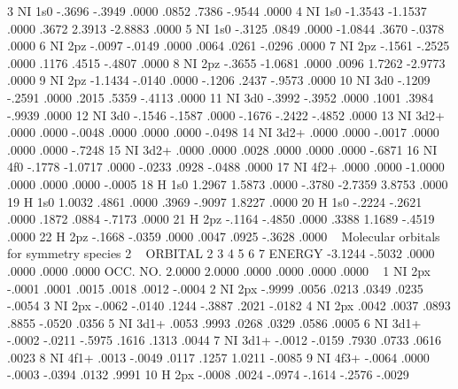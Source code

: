 \begin{sourcelisting}
 3 NI  1s0     -.3696    -.3949     .0000     .0852     .7386    -.9544     .0000 
 4 NI  1s0    -1.3543   -1.1537     .0000     .3672    2.3913   -2.8883     .0000 
 5 NI  1s0     -.3125     .0849     .0000   -1.0844     .3670    -.0378     .0000 
 6 NI  2pz     -.0097    -.0149     .0000     .0064     .0261    -.0296     .0000 
 7 NI  2pz     -.1561    -.2525     .0000     .1176     .4515    -.4807     .0000 
 8 NI  2pz     -.3655   -1.0681     .0000     .0096    1.7262   -2.9773     .0000 
 9 NI  2pz    -1.1434    -.0140     .0000    -.1206     .2437    -.9573     .0000 
10 NI  3d0     -.1209    -.2591     .0000     .2015     .5359    -.4113     .0000 
11 NI  3d0     -.3992    -.3952     .0000     .1001     .3984    -.9939     .0000 
12 NI  3d0     -.1546    -.1587     .0000    -.1676    -.2422    -.4852     .0000 
13 NI  3d2+     .0000     .0000    -.0048     .0000     .0000     .0000    -.0498 
14 NI  3d2+     .0000     .0000    -.0017     .0000     .0000     .0000    -.7248 
15 NI  3d2+     .0000     .0000     .0028     .0000     .0000     .0000    -.6871 
16 NI  4f0     -.1778   -1.0717     .0000    -.0233     .0928    -.0488     .0000 
17 NI  4f2+     .0000     .0000   -1.0000     .0000     .0000     .0000    -.0005 
18 H   1s0     1.2967    1.5873     .0000    -.3780   -2.7359    3.8753     .0000 
19 H   1s0     1.0032     .4861     .0000     .3969    -.9097    1.8227     .0000 
20 H   1s0     -.2224    -.2621     .0000     .1872     .0884    -.7173     .0000 
21 H   2pz     -.1164    -.4850     .0000     .3388    1.1689    -.4519     .0000 
22 H   2pz     -.1668    -.0359     .0000     .0047     .0925    -.3628     .0000 
~
   Molecular orbitals for symmetry species 2 
~
   ORBITAL        2         3         4         5         6         7    
   ENERGY     -3.1244    -.5032     .0000     .0000     .0000     .0000 
   OCC. NO.    2.0000    2.0000     .0000     .0000     .0000     .0000 
~
 1 NI  2px     -.0001     .0001     .0015     .0018     .0012    -.0004
 2 NI  2px     -.9999     .0056     .0213     .0349     .0235    -.0054
 3 NI  2px     -.0062    -.0140     .1244    -.3887     .2021    -.0182
 4 NI  2px      .0042     .0037     .0893     .8855    -.0520     .0356   
 5 NI  3d1+     .0053     .9993     .0268     .0329     .0586     .0005  
 6 NI  3d1+    -.0002    -.0211    -.5975     .1616     .1313     .0044 
 7 NI  3d1+    -.0012    -.0159     .7930     .0733     .0616     .0023 
 8 NI  4f1+     .0013    -.0049     .0117     .1257    1.0211    -.0085
 9 NI  4f3+    -.0064     .0000    -.0003    -.0394     .0132     .9991
10 H   2px     -.0008     .0024    -.0974    -.1614    -.2576    -.0029

\end{sourcelisting}
